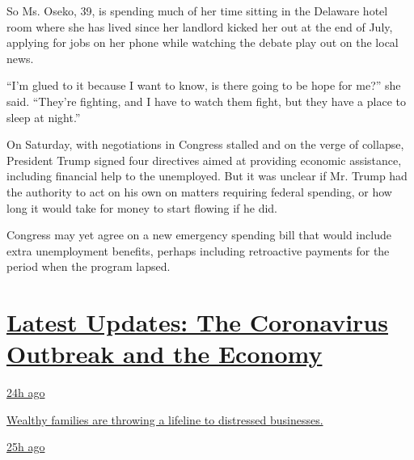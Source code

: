 So Ms. Oseko, 39, is spending much of her time sitting in the Delaware
hotel room where she has lived since her landlord kicked her out at the
end of July, applying for jobs on her phone while watching the debate
play out on the local news.

``I'm glued to it because I want to know, is there going to be hope for
me?'' she said. ``They're fighting, and I have to watch them fight, but
they have a place to sleep at night.''

On Saturday, with negotiations in Congress stalled and on the verge of
collapse, President Trump signed four directives aimed at providing
economic assistance, including financial help to the unemployed. But it
was unclear if Mr. Trump had the authority to act on his own on matters
requiring federal spending, or how long it would take for money to start
flowing if he did.

Congress may yet agree on a new emergency spending bill that would
include extra unemployment benefits, perhaps including retroactive
payments for the period when the program lapsed.

\hypertarget{latest-updates-the-coronavirus-outbreak-and-the-economy}{%
\section{\texorpdfstring{\href{https://www.nytimes.com/live/2020/08/07/business/stock-market-today-coronavirus?action=click\&pgtype=Article\&state=default\&region=MAIN_CONTENT_1\&context=storylines_live_updates}{Latest
Updates: The Coronavirus Outbreak and the
Economy}}{Latest Updates: The Coronavirus Outbreak and the Economy}}\label{latest-updates-the-coronavirus-outbreak-and-the-economy}}

\href{https://www.nytimes.com/live/2020/08/07/business/stock-market-today-coronavirus?action=click\&pgtype=Article\&state=default\&region=MAIN_CONTENT_1\&context=storylines_live_updates\#wealthy-families-are-throwing-a-lifeline-to-distressed-businesses}{24h
ago}

\href{https://www.nytimes.com/live/2020/08/07/business/stock-market-today-coronavirus?action=click\&pgtype=Article\&state=default\&region=MAIN_CONTENT_1\&context=storylines_live_updates\#wealthy-families-are-throwing-a-lifeline-to-distressed-businesses}{Wealthy
families are throwing a lifeline to distressed businesses.}

\href{https://www.nytimes.com/live/2020/08/07/business/stock-market-today-coronavirus?action=click\&pgtype=Article\&state=default\&region=MAIN_CONTENT_1\&context=storylines_live_updates\#the-publisher-of-the-onion-jezebel-and-other-websites-lays-off-15-employees}{25h
ago}

